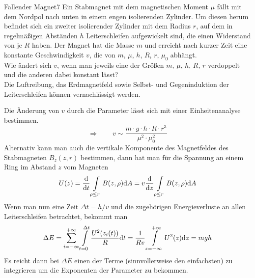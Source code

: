 \begin{problem}{Fallender Magnet}{7}
Ein Stabmagnet mit dem magnetischen Moment $\mu$ fällt mit dem Nordpol nach unten in einem engen isolierenden Zylinder. Um diesen herum befindet sich ein zweiter isolierender Zylinder mit dem Radius $r$, auf dem in regelmäßigen Abständen $h$ Leiterschleifen aufgewickelt sind, die einen Widerstand von je $R$ haben. Der Magnet hat die Masse $m$ und erreicht nach kurzer Zeit eine konstante Geschwindigkeit $v$, die von $m$, $\mu$, $h$, $R$, $r$, $\mu_0$ abhängt.\\
Wie ändert sich $v$, wenn man jeweils eine der Größen $m$, $\mu$, $h$, $R$, $r$ verdoppelt und die anderen dabei konstant lässt?\\
Die Luftreibung, das Erdmagnetfeld sowie Selbst- und Gegeninduktion der Leiterschleifen können vernachlässigt werden.
\begin{solution}
Die Änderung von $v$ durch die Parameter lässt sich mit einer Einheitenanalyse bestimmen.
\[
\Rightarrow\qquad v \sim \frac{m\cdot g\cdot h\cdot R \cdot r^3}{\mu^2\cdot \mu_0^2}
\]
Alternativ kann man auch die vertikale Komponente des Magnetfeldes des Stabmagneten $B_z(z,r)$ bestimmen, dann hat man für die Spannung an einem Ring im Abstand $z$ vom Magneten
\[
U(z) = \frac{\mathrm{d}}{\mathrm{d} t} \int\limits_{\rho \leq r} B(z,\rho) \mathrm{d} A = v \frac{\mathrm{d}}{\mathrm{d} z} \int\limits_{\rho \leq r} B(z,\rho) \mathrm{d} A
\]
Wenn man nun eine Zeit $\Delta t = h/v$ und die zugehörigen Energieverluste an allen Leiterschleifen betrachtet, bekommt man
\[
\Delta E = \sum_{i=-\infty}^{+\infty} \int\limits_{t=0}^{\Delta t} \frac{U^2(z_i(t))}{R} \mathrm{d} t
= \frac{1}{Rv} \int\limits_{z=-\infty}^{+\infty} U^2(z) \mathrm{d} z = mgh
\]
Es reicht dann bei $\Delta E$ einen der Terme (sinnvollerweise den einfachsten) zu integrieren um die Exponenten der Parameter zu bekommen.

\end{solution}
\end{problem}

